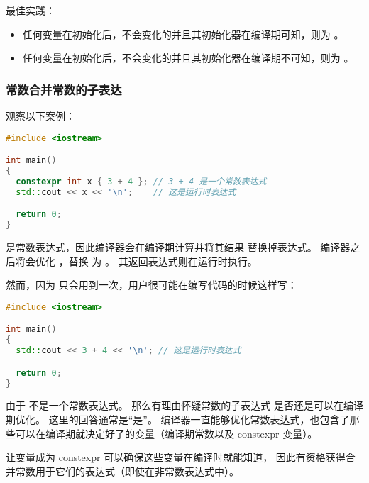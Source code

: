 \documentclass[../../LearnCpp.tex]{subfiles}
\begin{document}
最佳实践：

\begin{itemize}
  \item 任何变量在初始化后，不会变化的并且其初始化器在编译期可知，则为 。
  \item 任何变量在初始化后，不会变化的并且其初始化器在编译期不可知，则为 。
\end{itemize}

\subsubsection*{常数合并常数的子表达}

观察以下案例：

\begin{lstlisting}[language=C++]
#include <iostream>

int main()
{
  constexpr int x { 3 + 4 }; // 3 + 4 是一个常数表达式
  std::cout << x << '\n';    // 这是运行时表达式

  return 0;
}
\end{lstlisting}

 是常数表达式，因此编译器会在编译期计算并将其结果  替换掉表达式。
编译器之后将会优化 ，替换  为 。
其返回表达式则在运行时执行。

然而，因为  只会用到一次，用户很可能在编写代码的时候这样写：

\begin{lstlisting}[language=C++]
#include <iostream>

int main()
{
  std::cout << 3 + 4 << '\n'; // 这是运行时表达式

  return 0;
}
\end{lstlisting}

由于  不是一个常数表达式。
那么有理由怀疑常数的子表达式  是否还是可以在编译期优化。
这里的回答通常是“是”。
编译器一直能够优化常数表达式，也包含了那些可以在编译期就决定好了的变量（编译期常数以及 constexpr 变量）。

让变量成为 constexpr 可以确保这些变量在编译时就能知道，
因此有资格获得合并常数用于它们的表达式（即使在非常数表达式中）。
\end{document}
